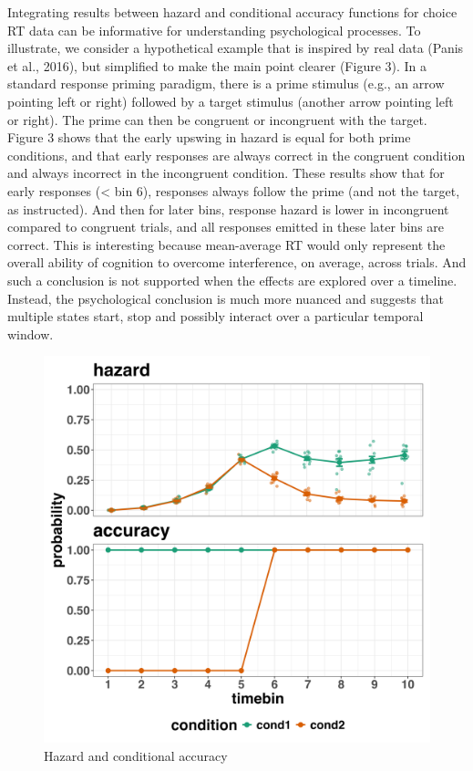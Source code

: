 \documentclass[
  man,floatsintext]{apa6}
\begin{document}
Integrating results between hazard and conditional accuracy functions for choice RT data can be informative for understanding psychological processes. To illustrate, we consider a hypothetical example that is inspired by real data (Panis et al., 2016), but simplified to make the main point clearer (Figure 3). In a standard response priming paradigm, there is a prime stimulus (e.g., an arrow pointing left or right) followed by a target stimulus (another arrow pointing left or right). The prime can then be congruent or incongruent with the target. Figure 3 shows that the early upswing in hazard is equal for both prime conditions, and that early responses are always correct in the congruent condition and always incorrect in the incongruent condition. These results show that for early responses (\textless{} bin 6), responses always follow the prime (and not the target, as instructed). And then for later bins, response hazard is lower in incongruent compared to congruent trials, and all responses emitted in these later bins are correct. This is interesting because mean-average RT would only represent the overall ability of cognition to overcome interference, on average, across trials. And such a conclusion is not supported when the effects are explored over a timeline. Instead, the psychological conclusion is much more nuanced and suggests that multiple states start, stop and possibly interact over a particular temporal window.



\begin{figure}[H]

{\centering \includegraphics[width=0.8\linewidth,height=0.67\textheight,]{../sims/figures/haz_acc} 

}

\caption{Hazard and conditional accuracy}\label{fig:plot3}
\end{figure}
\end{document}
